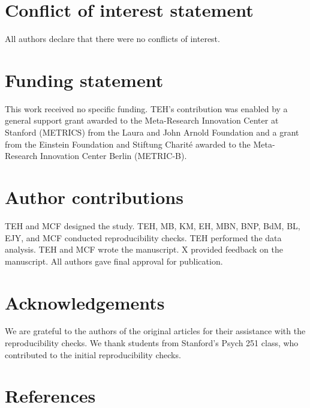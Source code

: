 \documentclass[english,,man,floatsintext]{apa6}
\begin{document}
\hypertarget{conflict-of-interest-statement}{%
\section{Conflict of interest statement}\label{conflict-of-interest-statement}}

All authors declare that there were no conflicts of interest.

\hypertarget{funding-statement}{%
\section{Funding statement}\label{funding-statement}}

This work received no specific funding. TEH's contribution was enabled by a general support grant awarded to the Meta-Research Innovation Center at Stanford (METRICS) from the Laura and John Arnold Foundation and a grant from the Einstein Foundation and Stiftung Charité awarded to the Meta-Research Innovation Center Berlin (METRIC-B).

\hypertarget{author-contributions}{%
\section{Author contributions}\label{author-contributions}}

TEH and MCF designed the study. TEH, MB, KM, EH, MBN, BNP, BdM, BL, EJY, and MCF conducted reproducibility checks. TEH performed the data analysis. TEH and MCF wrote the manuscript. X provided feedback on the manuscript. All authors gave final approval for publication.

\hypertarget{acknowledgements}{%
\section{Acknowledgements}\label{acknowledgements}}

We are grateful to the authors of the original articles for their assistance with the reproducibility checks. We thank students from Stanford's Psych 251 class, who contributed to the initial reproducibility checks.

\newpage

\hypertarget{references}{%
\section{References}\label{references}}

\setlength{\parindent}{-0.5in}
\setlength{\leftskip}{0.5in}
\end{document}
